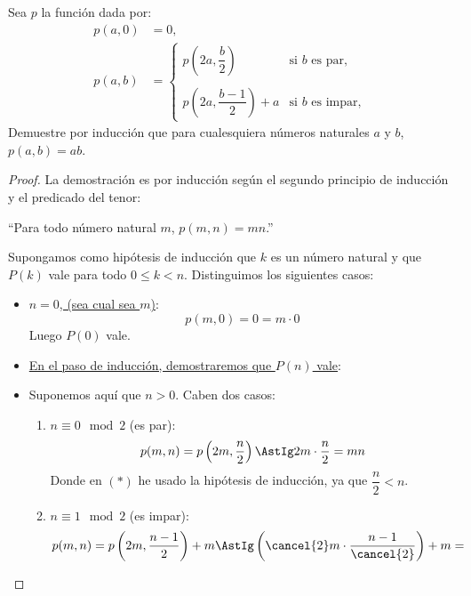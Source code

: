\begin{ejercicio}
Sea $p$ la función dada por:
    \begin{align*}
        p(a,0) &= 0,\\
        p(a,b) &= \left\{ \begin{array}{ll}
            p\left(2a,\dfrac{b}{2}\right) & \text{si } b \text{ es par, }\\
                                        & \\
            p\left(2a,\dfrac{b-1}{2}\right)+a & \text{si } b \text{ es impar, }
    \end{array}\right.
    \end{align*}
    Demuestre por inducción que para cualesquiera números naturales $a$ y $b$, $p(a,b) = ab$.
    \begin{comment}
        Notemos que esta función pasa a binario $b$ y almacena en $a$ tantos ''$2$'' como el popcount de $b$.
    \end{comment}
    \begin{proof}
       La demostración es por inducción según el segundo principio de inducción y el predicado del tenor: 
        \begin{center}
            ``Para todo número natural $m$, $p(m,n) = mn$.''
        \end{center}
        Supongamos como hipótesis de inducción que $k$ es un número natural y que $P(k)$ vale para todo $0 \leq k < n$. Distinguimos los siguientes casos:
        \begin{itemize}
            \item \ul{$n=0$, (sea cual sea $m$)}:
                $$p(m,0) = 0 = m \cdot 0$$
                Luego $P(0)$ vale.
            \item \ul{En el paso de inducción, demostraremos que $P(n)$ vale}:
            \item 
                Suponemos aquí que $n>0$. Caben dos casos:
                \begin{enumerate}
                    \item \ul{$n\equiv 0\mod 2$} (es par):
                        $$p(m,n) = p\left(2m, \dfrac{n}{2}\right) \AstIg 2m \cdot \dfrac{n}{2}=mn$$
                        Donde en $(\ast)$ he usado la hipótesis de inducción, ya que $\dfrac{n}{2} < n$.
                    \item \ul{$n\equiv 1\mod 2$} (es impar):
                        \begin{align*}
                            p(m,n) &= p\left(2m, \dfrac{n-1}{2}\right)+m \AstIg \left( \cancel{2}m \cdot \dfrac{n-1}{\cancel{2}}\right) +m =\\

\end{align*}
\end{enumerate}
\end{itemize}
\end{proof}
\end{ejercicio}
